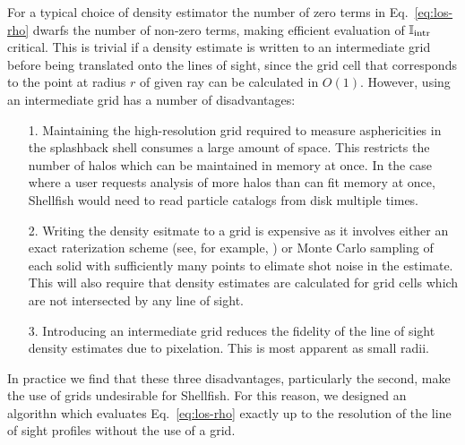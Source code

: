 \documentclass[numberedappendix,apj]{emulateapj}
\begin{document}
For a typical choice of density estimator the number of zero terms in
Eq.~\ref{eq:los-rho} dwarfs the number of non-zero terms, making efficient
evaluation of $\mathbb{I}_{\rm intr}$ critical. This is trivial if a density
estimate is written to an intermediate grid before being translated onto the
lines of sight, since the grid cell that corresponds to the point
at radius $r$ of given ray can be calculated in $O(1)$. However, using an
intermediate grid has a number of disadvantages:
\begin{enumerate}
        \item[1.] Maintaining the high-resolution grid required to measure
        asphericities in the splashback shell consumes
        a large amount of space. This restricts the number of halos which
        can be maintained in memory at once. In the case where a user requests
        analysis of more halos than can fit memory at once, Shellfish would need
        to read particle catalogs from disk multiple times.
        \item[2.] Writing the density esitmate to a grid is expensive as it
        involves either an exact raterization scheme (see, for example,
        \citealt{powell_abel_14}) or Monte Carlo sampling of each solid with
        sufficiently many points to elimate shot noise in the estimate. This
        will also require that density estimates are calculated for grid cells
        which are not intersected by any line of sight.
        \item[3.] Introducing an intermediate grid reduces the fidelity of the
        line of sight density estimates due to pixelation. This is most apparent as small
        radii.
\end{enumerate}
In practice we find that these three disadvantages, particularly the second,
make the use of grids undesirable for Shellfish. For this reason, we designed an
algorithn which evaluates Eq.~\ref{eq:los-rho} exactly up to the resolution of
the line of sight profiles without the use of a grid.
\end{document}
